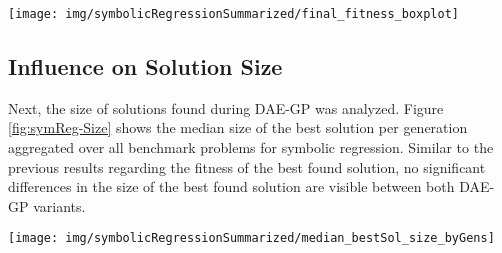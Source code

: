 \documentclass[
  11pt,
]{article}
\let\origfigure\figure
\let\endorigfigure\endfigure
\renewenvironment{figure}[1][2] {
    \expandafter\origfigure\expandafter[H]
} {
    \endorigfigure
}
\begin{document}
\begin{figure}[c]

{\centering \texttt{[image: img/symbolicRegressionSummarized/final\_fitness\_boxplot]} 

}

\caption{Fitness after 30 Generations - Real World Symbolic Regression}\label{fig:symReg-Fitness-BoxPlots}
\end{figure}

\hypertarget{influence-on-solution-size}{%
\subsection{Influence on Solution Size}\label{influence-on-solution-size}}

Next, the size of solutions found during DAE-GP was analyzed.
Figure \ref{fig:symReg-Size} shows the median size of the best solution per generation aggregated over all benchmark problems for symbolic regression.
Similar to the previous results regarding the fitness of the best found solution, no significant differences in the size of the best found solution are visible between both DAE-GP variants.

\begin{figure}[c]

{\centering \texttt{[image: img/symbolicRegressionSummarized/median\_bestSol\_size\_byGens]} 

}

\caption{Size of the best Solution over 30 Generations - Real World Symbolic Regression}\label{fig:symReg-Size}
\end{figure}
\end{document}

